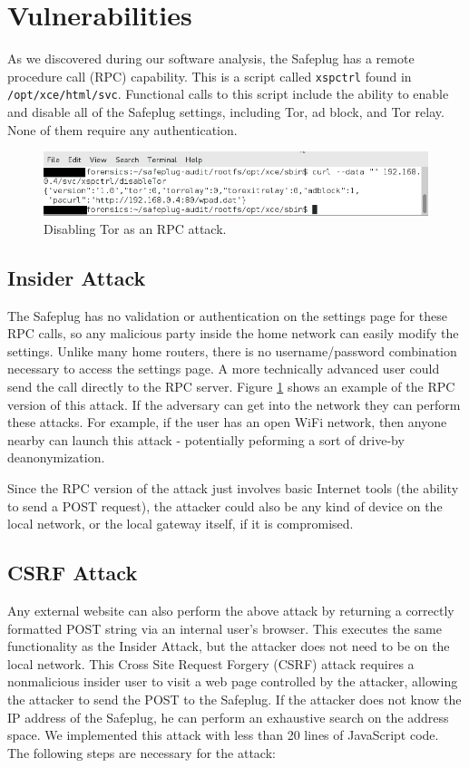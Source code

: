 \documentclass[letterpaper,twocolumn,10pt]{article}
\begin{document}
\section{Vulnerabilities}
As we discovered during our software analysis, the Safeplug has a remote procedure call (RPC) capability.  This is a script called \verb!xspctrl! found in \verb!/opt/xce/html/svc!.  Functional calls to this script include the ability to enable and disable all of the Safeplug settings, including Tor, ad block, and Tor relay.  None of them require any authentication.

\begin{figure}
  \centering
  \includegraphics[width=.5\textwidth]{disabletor2}
  \caption{Disabling Tor as an RPC attack.}
  \label{disable}
\end{figure}

\subsection{Insider Attack}
The Safeplug has no validation or authentication on the settings page for these RPC calls, so any malicious party inside the home network can easily modify the settings.  Unlike many home routers, there is no username/password combination necessary to access the settings page.  A more technically advanced user could send the call directly to the RPC server.  Figure \ref{disable} shows an example of the RPC version of this attack.  If the adversary can get into the network they can perform these attacks.  For example, if the user has an open WiFi network, then anyone nearby can launch this attack - potentially peforming a sort of drive-by deanonymization. 

Since the RPC version of the attack just involves basic Internet tools (the ability to send a POST request), the attacker could also be any kind of device on the local network, or the local gateway itself, if it is compromised.

\subsection{CSRF Attack}
Any external website can also perform the above attack by returning a correctly formatted POST string via an internal user's browser.  This executes the same functionality as the Insider Attack, but the attacker does not need to be on the local network.  This Cross Site Request Forgery (CSRF) attack requires a nonmalicious insider user to visit a web page controlled by the attacker, allowing the attacker to send the POST to the Safeplug.  If the attacker does not know the IP address of the Safeplug, he can perform an exhaustive search on the address space.  We implemented this attack with less than 20 lines of JavaScript code.  The following steps are necessary for the attack:
\end{document}
